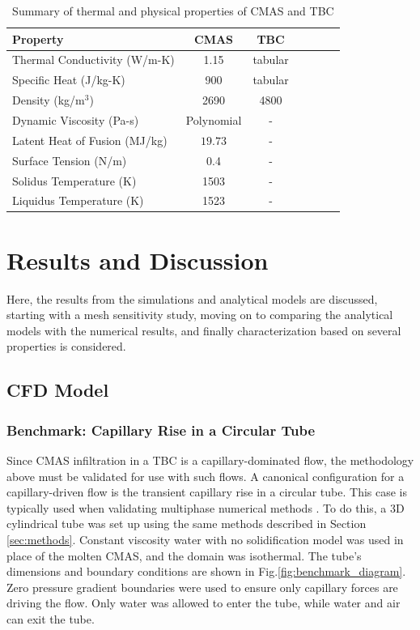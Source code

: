 \documentclass[%
 aip,
 amsmath,amssymb,
 reprint,%
]{revtex4-1}
\begin{document}
\begin{table}[htp!]
\caption{\label{tab:CMAS and TBC properties} Summary of thermal and physical properties of CMAS and TBC}
\centering
\begin{ruledtabular}
\begin{tabular}{lcccccc}
Property & CMAS& TBC\\\hline
Thermal Conductivity (W/m-K)& 1.15 \cite{Bakal2017} & tabular \cite{Han2023} \\
Specific Heat (J/kg-K)& 900 \cite{KAKUDA2015350} & tabular \cite{Han2023} \\
Density (kg/m$^3$)& 2690 \cite{BANSAL20153901}& 4800 \cite{KAKUDA20092583}\\
Dynamic Viscosity (Pa-s)& Polynomial \cite{Naraparaju2019}& -\\
Latent Heat of Fusion (MJ/kg)& $19.73$ \cite{Costa2019}& -\\
Surface Tension (N/m)& 0.4 \cite{Bravo2020}& -\\
Solidus Temperature (K) & 1503\cite{Naraparaju2014} &-\\
Liquidus Temperature (K) & 1523\cite{Naraparaju2014} &-\\
\end{tabular}
\end{ruledtabular}
\end{table}



\section{Results and Discussion}
Here, the results from the simulations and analytical models are discussed, starting with a mesh sensitivity study, moving on to comparing the analytical models with the numerical results, and finally characterization based on several properties is considered.

\subsection{CFD Model}
\subsubsection{Benchmark: Capillary Rise in a Circular Tube}

Since CMAS infiltration in a TBC is a capillary-dominated flow, the methodology above must be validated for use with such flows.
A canonical configuration for a capillary-driven flow is the transient capillary rise in a circular tube.
This case is typically used when validating multiphase numerical methods \cite{GRUNDING2020142, Shiri2022}. 
To do this, a 3D cylindrical tube was set up using the same methods described in Section \ref{sec:methods}.
Constant viscosity water with no solidification model was used in place of the molten CMAS, and the domain was isothermal.
The tube's dimensions and boundary conditions are shown in Fig.\ref{fig:benchmark_diagram}. Zero pressure gradient boundaries were used to ensure only capillary forces are driving the flow. Only water was allowed to enter the tube, while water and air can exit the tube.
\end{document}
